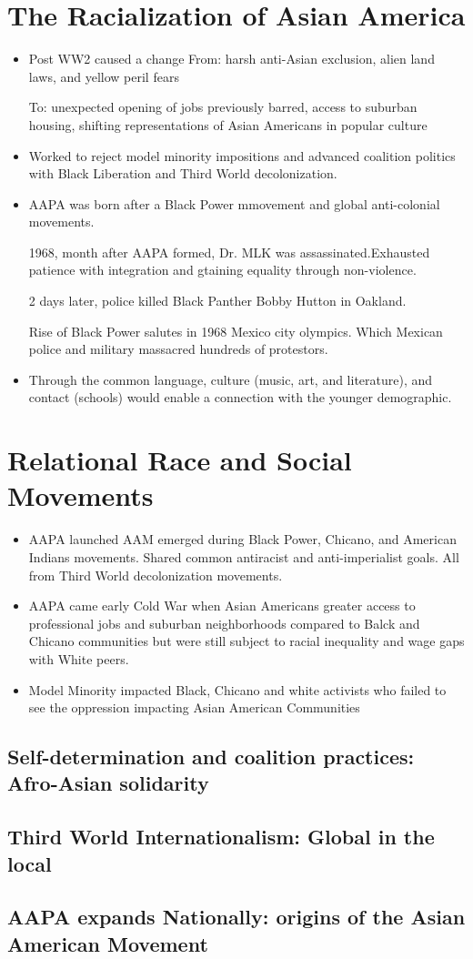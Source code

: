 \documentclass{article}
\begin{document}
\section*{The Racialization of Asian America}
\begin{itemize}
  \item Post WW2 caused a change 
    From: harsh anti-Asian exclusion, alien land laws, and yellow peril fears

    To: unexpected opening of jobs previously barred, access to
    suburban housing, shifting representations of Asian Americans in popular culture

  \item Worked to reject model minority impositions and advanced coalition politics with
    Black Liberation and Third World decolonization.
  \item AAPA was born after a Black Power mmovement and global
    anti-colonial movements.

    1968, month after AAPA formed, Dr. MLK was assassinated.Exhausted patience 
    with integration and gtaining equality through non-violence.

    2 days later, police killed Black Panther Bobby Hutton in Oakland.

    Rise of Black Power salutes in 1968 Mexico city olympics.
    Which Mexican police and military massacred hundreds of protestors.

  \item Through the common language, culture 
    (music, art, and literature),
    and contact (schools) would enable a connection with the younger 
    demographic.

\end{itemize}

\section*{Relational Race and Social Movements}
\begin{itemize}
  \item AAPA launched AAM emerged during Black Power, Chicano, and American Indians
    movements. Shared common antiracist and anti-imperialist goals. All
    from Third World decolonization movements.
  \item AAPA came early Cold War when Asian Americans greater access
    to professional jobs and suburban neighborhoods compared to Balck and Chicano communities
    but were still subject to racial inequality and wage gaps with White peers.
  \item Model Minority impacted Black, Chicano and white activists 
    who failed to see the oppression impacting Asian American Communities
\end{itemize}

\subsection{Self-determination and coalition practices: Afro-Asian solidarity}

\subsection{Third World Internationalism: Global in the local}

\subsection{AAPA expands Nationally: origins of the Asian American Movement}
\end{document}
